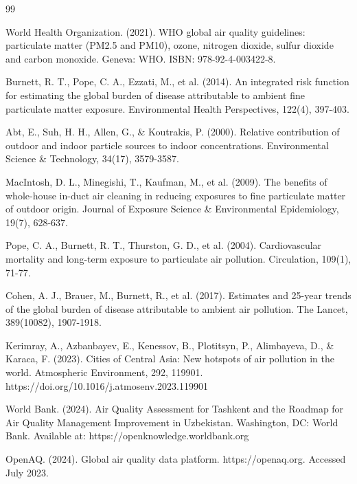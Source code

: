 \documentclass[11pt,a4paper]{article}
\begin{document}

\begin{thebibliography}{99}

World Health Organization. (2021). WHO global air quality guidelines: particulate matter (PM2.5 and PM10), ozone, nitrogen dioxide, sulfur dioxide and carbon monoxide. Geneva: WHO. ISBN: 978-92-4-003422-8.

Burnett, R. T., Pope, C. A., Ezzati, M., et al. (2014). An integrated risk function for estimating the global burden of disease attributable to ambient fine particulate matter exposure. Environmental Health Perspectives, 122(4), 397-403.

Abt, E., Suh, H. H., Allen, G., \& Koutrakis, P. (2000). Relative contribution of outdoor and indoor particle sources to indoor concentrations. Environmental Science \& Technology, 34(17), 3579-3587.

MacIntosh, D. L., Minegishi, T., Kaufman, M., et al. (2009). The benefits of whole-house in-duct air cleaning in reducing exposures to fine particulate matter of outdoor origin. Journal of Exposure Science \& Environmental Epidemiology, 19(7), 628-637.

Pope, C. A., Burnett, R. T., Thurston, G. D., et al. (2004). Cardiovascular mortality and long-term exposure to particulate air pollution. Circulation, 109(1), 71-77.

Cohen, A. J., Brauer, M., Burnett, R., et al. (2017). Estimates and 25-year trends of the global burden of disease attributable to ambient air pollution. The Lancet, 389(10082), 1907-1918.

Kerimray, A., Azbanbayev, E., Kenessov, B., Plotitsyn, P., Alimbayeva, D., \& Karaca, F. (2023). Cities of Central Asia: New hotspots of air pollution in the world. Atmospheric Environment, 292, 119901. https://doi.org/10.1016/j.atmosenv.2023.119901

World Bank. (2024). Air Quality Assessment for Tashkent and the Roadmap for Air Quality Management Improvement in Uzbekistan. Washington, DC: World Bank. Available at: https://openknowledge.worldbank.org

OpenAQ. (2024). Global air quality data platform. https://openaq.org. Accessed July 2023.

\end{thebibliography}
\end{document}
